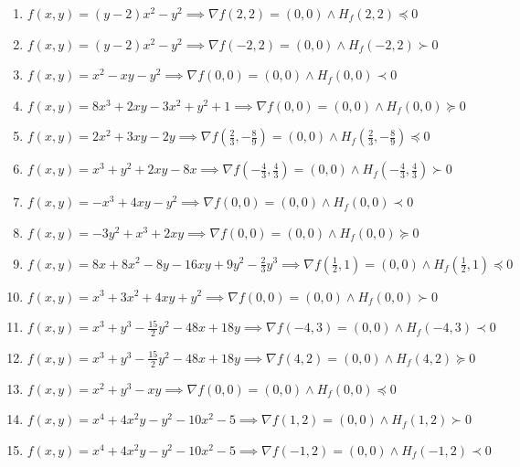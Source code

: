 \documentclass[11pt,a4paper]{article}
\begin{document}
\begin{enumerate}
\item $\displaystyle f(x, y) = (y - 2) x^{2} - y^{2} \implies \nabla f(2, 2) = (0, 0) \land H_{f}(2, 2) \preceq 0$
\item $\displaystyle f(x, y) = (y - 2) x^{2} - y^{2} \implies \nabla f(-2, 2) = (0, 0) \land H_{f}(-2, 2) \succ 0$
\item $\displaystyle f(x, y) = x^{2} - xy - y^{2} \implies \nabla f(0, 0) = (0, 0) \land H_{f}(0, 0) \prec 0$
\item $\displaystyle f(x, y) = 8x^{3} + 2xy - 3x^{2} + y^{2} + 1 \implies \nabla f(0, 0) = (0, 0) \land H_{f}(0, 0) \succeq 0$
\item $\displaystyle f(x, y) = 2x^{2} + 3xy - 2y \implies \nabla f\left( \frac{2}{3}, -\frac{8}{9} \right) = (0, 0) \land H_{f}\left( \frac{2}{3}, -\frac{8}{9} \right) \preceq 0$
\item $\displaystyle f(x, y) = x^{3} + y^{2} + 2xy - 8x \implies \nabla f\left( -\frac{4}{3}, \frac{4}{3} \right) = (0, 0) \land H_{f}\left( -\frac{4}{3}, \frac{4}{3} \right) \succ 0$
\item $\displaystyle f(x, y) = -x^{3} + 4xy - y^{2} \implies \nabla f(0, 0) = (0, 0) \land H_{f}(0, 0) \prec 0$
\item $\displaystyle f(x, y) = -3y^{2} + x^{3} + 2xy \implies \nabla f(0, 0) = (0, 0) \land H_{f}(0, 0) \succeq 0$
\item $\displaystyle f(x, y) = 8x + 8x^{2} - 8y - 16xy + 9y^{2} - \frac{2}{3} y^{3} \implies \nabla f\left( \frac{1}{2}, 1 \right) = (0, 0) \land H_{f}\left( \frac{1}{2}, 1 \right) \preceq 0$
\item $\displaystyle f(x, y) = x^{3} + 3x^{2} + 4xy + y^{2} \implies \nabla f(0, 0) = (0, 0) \land H_{f}(0, 0) \succ 0$
\item $\displaystyle f(x, y) = x^{3} + y^{3} - \frac{15}{2} y^{2} - 48x + 18y \implies \nabla f(-4, 3) = (0, 0) \land H_{f}(-4, 3) \prec 0$
\item $\displaystyle f(x, y) = x^{3} + y^{3} - \frac{15}{2} y^{2} - 48x + 18y \implies \nabla f(4, 2) = (0, 0) \land H_{f}(4, 2) \succeq 0$
\item $\displaystyle f(x, y) = x^{2} + y^{3} - xy \implies \nabla f(0, 0) = (0, 0) \land H_{f}(0, 0) \preceq 0$
\item $\displaystyle f(x, y) = x^{4} + 4x^{2} y - y^{2} - 10x^{2} - 5 \implies \nabla f(1, 2) = (0, 0) \land H_{f}(1, 2) \succ 0$
\item $\displaystyle f(x, y) = x^{4} + 4x^{2} y - y^{2} - 10x^{2} - 5 \implies \nabla f(-1, 2) = (0, 0) \land H_{f}(-1, 2) \prec 0$

\end{enumerate}
\end{document}
